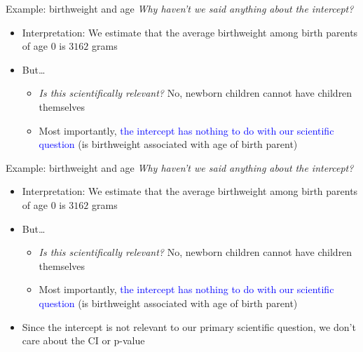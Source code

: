 \documentclass[10pt,t]{beamer}
\begin{document}
\begin{frame}{Example: birthweight and age}
\textit{Why haven't we said anything about the intercept?}
\vspace{0.3cm}
\begin{itemize}
	\item Interpretation: We estimate that the average birthweight among birth parents of age $0$ is $3162$ grams
	\item But\dots
	\begin{itemize}
		\item \textit{Is this scientifically relevant?} No, newborn children cannot have children themselves
		\item Most importantly, \textcolor{blue}{the intercept has nothing to do with our scientific question} (is birthweight associated with age of birth parent)
	\end{itemize}
\end{itemize}
\end{frame}

\begin{frame}{Example: birthweight and age}
\textit{Why haven't we said anything about the intercept?}
\vspace{0.3cm}
\begin{itemize}
	\item Interpretation: We estimate that the average birthweight among birth parents of age $0$ is $3162$ grams
	\item But\dots
	\begin{itemize}
		\item \textit{Is this scientifically relevant?} No, newborn children cannot have children themselves
		\item Most importantly, \textcolor{blue}{the intercept has nothing to do with our scientific question} (is birthweight associated with age of birth parent)
	\end{itemize}
	\item Since the intercept is not relevant to our primary scientific question, we don't care about the CI or p-value
\end{itemize}
\end{frame}
\end{document}
